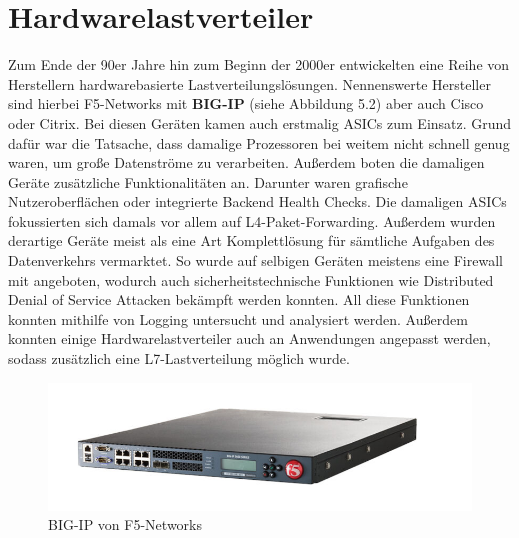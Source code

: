 \section{Hardwarelastverteiler}
Zum Ende der 90er Jahre hin zum Beginn der 2000er entwickelten eine Reihe von Herstellern hardwarebasierte Lastverteilungslösungen. Nennenswerte Hersteller sind hierbei F5-Networks mit \textbf{BIG-IP} (siehe Abbildung 5.2) aber auch Cisco oder Citrix. Bei diesen Geräten kamen auch erstmalig ASICs zum Einsatz. Grund dafür war die Tatsache, dass damalige Prozessoren bei weitem nicht schnell genug waren, um große Datenströme zu verarbeiten. Außerdem boten die damaligen Geräte zusätzliche Funktionalitäten an. Darunter waren grafische Nutzeroberflächen oder integrierte Backend Health Checks. \cite{bigip} Die damaligen ASICs fokussierten sich damals vor allem auf L4-Paket-Forwarding. Außerdem wurden derartige Geräte meist als eine Art Komplettlösung für sämtliche Aufgaben des Datenverkehrs vermarktet. So wurde auf selbigen Geräten meistens eine Firewall mit angeboten, wodurch auch sicherheitstechnische Funktionen wie Distributed Denial of Service Attacken bekämpft werden konnten. All diese Funktionen konnten mithilfe von Logging untersucht und analysiert werden. Außerdem konnten einige Hardwarelastverteiler auch an Anwendungen angepasst werden, sodass zusätzlich eine L7-Lastverteilung möglich wurde.
\begin{figure}
    \centering
    \includegraphics[width=1\linewidth]{images/s-l1600.jpg}
    \caption{BIG-IP von F5-Networks \cite{wtit_bigip_5000_series}}
    \label{fig:enter-label}
\end{figure}
